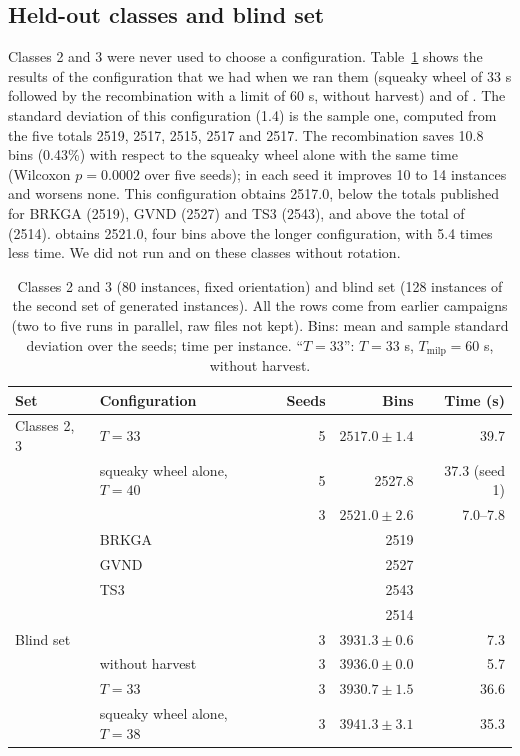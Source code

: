 \subsection{Held-out classes and blind set}
\label{sec:e-heldout}

Classes 2 and 3 were never used to choose a configuration. Table~\ref{tab:e-heldout} shows the results of the configuration that we had when we ran them
(squeaky wheel of 33 s followed by the recombination with a limit of 60 s, without harvest) and of \cfgfast{}. The
standard deviation of this configuration (1.4) is the sample one, computed from the five totals 2519, 2517, 2515, 2517 and 2517. The
recombination saves 10.8 bins (0.43\%) with respect to the squeaky wheel alone with the same time (Wilcoxon $p=0.0002$ over five seeds); in each
seed it improves 10 to 14 instances and worsens none. This configuration obtains 2517.0, below the totals published for BRKGA (2519), GVND (2527) and TS3
(2543), and above the total of \citet{Mahvash2018} (2514). \cfgfast{} obtains 2521.0, four bins above the longer configuration, with 5.4 times less
time. We did not run \cfgbal{} and \cfgqual{} on these classes without rotation.

\begin{table}[t]
\centering
\small\setlength{\tabcolsep}{4pt}
\caption{Classes 2 and 3 (80 instances, fixed orientation) and blind set (128 instances of the second set of generated instances). All the rows come from earlier campaigns (two to five runs in parallel, raw files not kept). Bins: mean and
sample standard deviation over the seeds; time per instance. ``$T=33$'': $T=33$ s, $T_{\mathrm{milp}}=60$ s, without harvest.}
\label{tab:e-heldout}
\begin{tabular}{@{}llrrr@{}}
\toprule
Set & Configuration & Seeds & Bins & Time (s)\\
\midrule
Classes 2, 3 & $T=33$ & 5 & $2517.0\pm 1.4$ & 39.7\\
 & squeaky wheel alone, $T=40$ & 5 & 2527.8 & 37.3 (seed 1)\\
 & \cfgfast{} & 3 & $2521.0\pm 2.6$ & 7.0--7.8\\
 & BRKGA & & 2519 & \\
 & GVND & & 2527 & \\
 & TS3 & & 2543 & \\
 & \citet{Mahvash2018} & & 2514 & \\
\midrule
Blind set & \cfgfast{} & 3 & $3931.3\pm 0.6$ & 7.3\\
 & \cfgfast{} without harvest & 3 & $3936.0\pm 0.0$ & 5.7\\
 & $T=33$ & 3 & $3930.7\pm 1.5$ & 36.6\\
 & squeaky wheel alone, $T=38$ & 3 & $3941.3\pm 3.1$ & 35.3\\
\bottomrule
\end{tabular}
\end{table}

